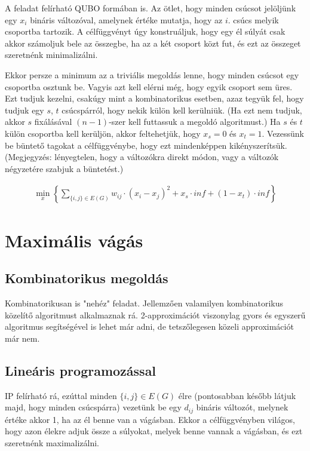 A feladat felírható QUBO formában is. Az ötlet, hogy minden csúcsot jelöljünk egy $x_i$ bináris változóval, amelynek értéke mutatja, hogy az $i.$ csúcs melyik csoportba tartozik. A célfüggvényt úgy konstruáljuk, hogy egy él súlyát csak akkor számoljuk bele az összegbe, ha az a két csoport közt fut, és ezt az összeget szeretnénk minimalizálni.

Ekkor persze a minimum az a triviális megoldás lenne, hogy minden csúcsot egy csoportba osztunk be. Vagyis azt kell elérni még, hogy egyik csoport sem üres.
Ezt tudjuk kezelni, csakúgy mint a kombinatorikus esetben, azaz tegyük fel, hogy tudjuk egy $s$, $t$ csúcspárról, hogy nekik külön kell kerülniük. (Ha ezt nem tudjuk, akkor $s$ fixálásával $(n-1)$-szer kell futtassuk a megoldó algoritmust.)
Ha $s$ és $t$ külön csoportba kell kerüljön, akkor feltehetjük, hogy $x_s=0$ és $x_t=1$. Vezessünk be büntető tagokat a célfüggvénybe, hogy ezt mindenképpen kikényszerítsük. (Megjegyzés: lényegtelen, hogy a változókra direkt módon, vagy a változók négyzetére szabjuk a büntetést.)

\begin{align}
	\min_{x} \left\{ \sum_ {\{i,j\}\in E(G)}{w_{ij}\cdot(x_i-x_j)^2} + x_s\cdot inf + (1-x_t)\cdot inf \right\}
\end{align}


\section{Maximális vágás}

\subsection{Kombinatorikus megoldás}

Kombinatorikusan is "nehéz" feladat. Jellemzően valamilyen kombinatorikus közelítő algoritmust alkalmaznak rá. 2-approximációt viszonylag gyors és egyszerű algoritmus segítségével is lehet már adni, de tetszőlegesen közeli approximációt már nem.

\subsection{Lineáris programozással}

IP felírható rá, ezúttal minden $\{i,j\} \in E(G)$ élre (pontosabban később látjuk majd, hogy minden csúcspárra) vezetünk be egy $d_{ij}$ bináris változót, melynek értéke akkor 1, ha az él benne van a vágásban. Ekkor a célfüggvényben világos, hogy azon élekre adjuk össze a súlyokat, melyek benne vannak a vágásban, és ezt szeretnénk maximalizálni.

